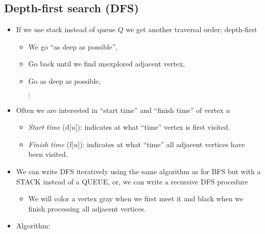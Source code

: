 \subsection{Depth-first search (DFS)}
\begin{itemize}
	\item If we use stack instead of queue $Q$ we get another traversal order;
	depth-first
	\begin{itemize}
		\item We go ``as deep as possible'',
		\item Go back until we find unexplored adjacent vertex,
		\item Go as deep as possible,
		
		$\vdots$
	\end{itemize}
	\item Often we are interested in ``start time'' and ``finish time'' of
	vertex $u$
	\begin{itemize}
		\item {\em Start time\/} (d[$u$]): indicates at what ``time'' vertex
		is first visited.
		\item {\em Finish time\/} (f[$u$]): indicates at what ``time'' all
		adjacent vertices have been visited.
	\end{itemize}
	\item We can write DFS iteratively using the same algorithm as for BFS
	but with a STACK instead of a QUEUE, or, we can write a recursive DFS
	procedure
	\begin{itemize}
		\item We will color a vertex gray when we first meet it and black
		when we finish processing all adjacent vertices.
	\end{itemize}
	\item Algorithm: \\
	
	

\end{itemize}

